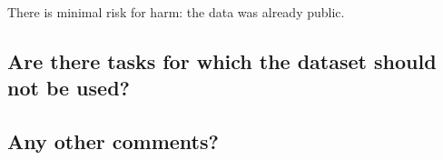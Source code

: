 There is minimal risk for harm: the data was already public.
\subsection*{Are there tasks for which the dataset should not be used?}
\subsection*{Any other comments?}
